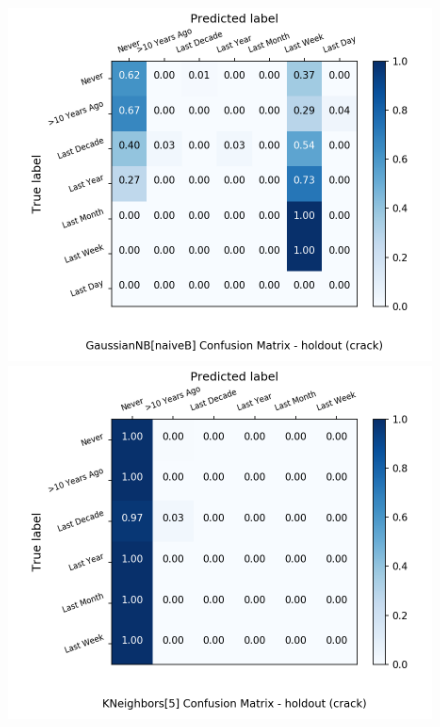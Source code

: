 \begin{figure}[H]
\begin{minipage}[b]{0.32\textwidth}
		\includegraphics[width=1.1\textwidth]{Plots/crack_GaussianNB_naiveB_balance_False_holdout.png}
	\end{minipage}
	\begin{minipage}[b]{0.32\textwidth}
		\includegraphics[width=1.1\textwidth]{Plots/crack_KNeighbors_5_balance_False_holdout.png}
  \end{minipage}
	\begin{minipage}[b]{0.32\textwidth}

\end{minipage}
\end{figure}
